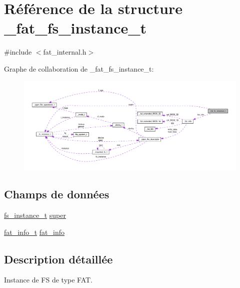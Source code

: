 \hypertarget{struct__fat__fs__instance__t}{\section{\-Référence de la structure \-\_\-fat\-\_\-fs\-\_\-instance\-\_\-t}
\label{struct__fat__fs__instance__t}
}


{\ttfamily \#include $<$fat\-\_\-internal.\-h$>$}



\-Graphe de collaboration de \-\_\-fat\-\_\-fs\-\_\-instance\-\_\-t\-:\nopagebreak
\begin{figure}[H]
\begin{center}
\leavevmode
\includegraphics[width=350pt]{struct__fat__fs__instance__t__coll__graph}
\end{center}
\end{figure}
\subsection*{\-Champs de données}
\begin{DoxyCompactItemize}
\item 
\hyperlink{vfs_8h_a0eefa9aac35a5462ebf1e038992ca860}{fs\-\_\-instance\-\_\-t} \hyperlink{struct__fat__fs__instance__t_ac50318180f107a1950961c404ec6fd6d}{super}
\item 
\hyperlink{fat__internal_8h_a1921d26ef987e5498294fe311a23c62f}{fat\-\_\-info\-\_\-t} \hyperlink{struct__fat__fs__instance__t_acebada58b620f950c9ef3c454db812fc}{fat\-\_\-info}
\end{DoxyCompactItemize}


\subsection{\-Description détaillée}
\-Instance de \-F\-S de type \-F\-A\-T. 


